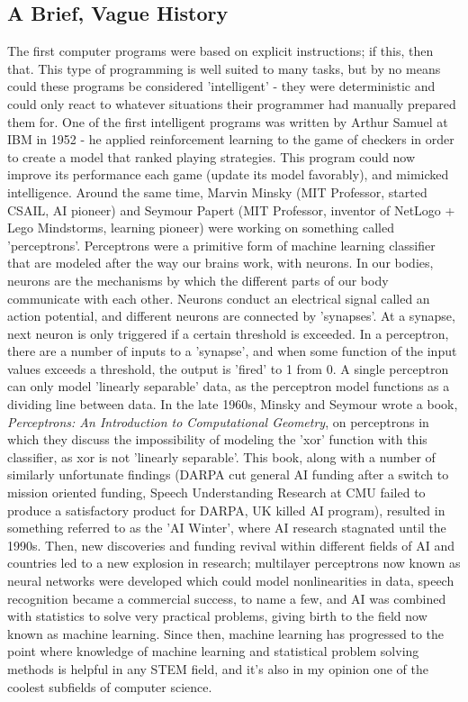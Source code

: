 \documentclass[11pt]{article}
\begin{document}
\subsection{A Brief, Vague History}
The first computer programs were based on explicit instructions; if this, then that. This type of programming is well suited to many tasks, but by no means could these programs be considered 'intelligent' - they were deterministic and could only react to whatever situations their programmer had manually prepared them for. One of the first intelligent programs was written by Arthur Samuel at IBM in 1952 - he applied reinforcement learning to the game of checkers in order to create a model that ranked playing strategies. This program could now improve its performance each game (update its model favorably), and mimicked intelligence. Around the same time, Marvin Minsky (MIT Professor, started CSAIL, AI pioneer) and Seymour Papert (MIT Professor, inventor of NetLogo + Lego Mindstorms, learning pioneer) were working on something called 'perceptrons'. Perceptrons were a primitive form of machine learning classifier that are modeled after the way our brains work, with neurons. In our bodies, neurons are the mechanisms by which the different parts of our body communicate with each other. Neurons conduct an electrical signal called an action potential, and different neurons are connected by 'synapses'. At a synapse, next neuron is only triggered if a certain threshold is exceeded. In a perceptron, there are a number of inputs to a 'synapse', and when some function of the input values exceeds a threshold, the output is 'fired' to 1 from 0. A single perceptron can only model 'linearly separable' data, as the perceptron model functions as a dividing line between data. In the late 1960s, Minsky and Seymour wrote a book, \textit{Perceptrons: An Introduction to Computational Geometry}, on perceptrons in which they discuss the impossibility of modeling the 'xor' function with this classifier, as xor is not 'linearly separable'. This book, along with a number of similarly unfortunate findings (DARPA cut general AI funding after a switch to mission oriented funding, Speech Understanding Research at CMU failed to produce a satisfactory product for DARPA, UK killed AI program), resulted in something referred to as the 'AI Winter', where AI research stagnated until the 1990s. Then, new discoveries and funding revival within different fields of AI and countries led to a new explosion in research; multilayer perceptrons now known as neural networks were developed which could model nonlinearities in data, speech recognition became a commercial success, to name a few, and AI was combined with statistics to solve very practical problems, giving birth to the field now known as machine learning. Since then, machine learning has progressed to the point where knowledge of machine learning and statistical problem solving methods is helpful in any STEM field, and it's also in my opinion one of the coolest subfields of computer science.
\end{document}
